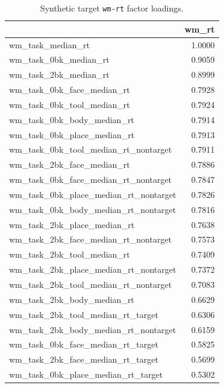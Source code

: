 \documentclass{article}
\begin{document}
\begin{table}[H]
\centering
\begin{tabular}{lr}
\toprule
 & wm\_rt \\
\midrule
wm\_task\_median\_rt & 1.0000 \\
wm\_task\_0bk\_median\_rt & 0.9059 \\
wm\_task\_2bk\_median\_rt & 0.8999 \\
wm\_task\_0bk\_face\_median\_rt & 0.7928 \\
wm\_task\_0bk\_tool\_median\_rt & 0.7924 \\
wm\_task\_0bk\_body\_median\_rt & 0.7914 \\
wm\_task\_0bk\_place\_median\_rt & 0.7913 \\
wm\_task\_0bk\_tool\_median\_rt\_nontarget & 0.7911 \\
wm\_task\_2bk\_face\_median\_rt & 0.7886 \\
wm\_task\_0bk\_face\_median\_rt\_nontarget & 0.7847 \\
wm\_task\_0bk\_place\_median\_rt\_nontarget & 0.7826 \\
wm\_task\_0bk\_body\_median\_rt\_nontarget & 0.7816 \\
wm\_task\_2bk\_place\_median\_rt & 0.7638 \\
wm\_task\_2bk\_face\_median\_rt\_nontarget & 0.7573 \\
wm\_task\_2bk\_tool\_median\_rt & 0.7409 \\
wm\_task\_2bk\_place\_median\_rt\_nontarget & 0.7372 \\
wm\_task\_2bk\_tool\_median\_rt\_nontarget & 0.7083 \\
wm\_task\_2bk\_body\_median\_rt & 0.6629 \\
wm\_task\_2bk\_tool\_median\_rt\_target & 0.6306 \\
wm\_task\_2bk\_body\_median\_rt\_nontarget & 0.6159 \\
wm\_task\_0bk\_face\_median\_rt\_target & 0.5825 \\
wm\_task\_2bk\_face\_median\_rt\_target & 0.5699 \\
wm\_task\_0bk\_place\_median\_rt\_target & 0.5302 \\
\bottomrule
\end{tabular}

\footnotesize
\caption{Synthetic target \texttt{wm-rt} factor loadings.}
\normalsize
\label{tab:wm-rt}
\end{table}
\end{document}
